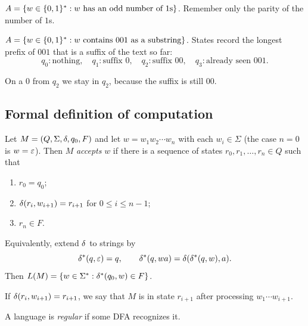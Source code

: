 \begin{example}
$A=\{w\in\{0,1\}^*:w\text{ has an odd number of }1\text{s}\}$.
Remember only the parity of the number of $1$s.
\begin{center}
\end{center}
\end{example}

\begin{example}[Substring $001$]
$A=\{w\in\{0,1\}^*:w\text{ contains }001\text{ as a substring}\}$.
States record the longest prefix of $001$ that is a suffix of the text so
far:
\[
  q_0:\text{nothing},\quad
  q_1:\text{suffix }0,\quad
  q_2:\text{suffix }00,\quad
  q_3:\text{already seen }001.
\]
\begin{center}
\end{center}
On a $0$ from $q_2$ we stay in $q_2$, because the suffix is still $00$.
\end{example}

\subsection{Formal definition of computation}
\begin{definition}
Let $M=(Q,\Sigma,\delta,q_0,F)$ and let $w=w_1w_2\cdots w_n$ with each
$w_i\in\Sigma$ (the case $n=0$ is $w=\varepsilon$). Then $M$ \emph{accepts} $w$ if
there is a sequence of states $r_0,r_1,\ldots,r_n\in Q$ such that
\begin{enumerate}
  \item $r_0=q_0$;
  \item $\delta(r_i,w_{i+1})=r_{i+1}$ for $0\leq i\leq n-1$;
  \item $r_n\in F$.
\end{enumerate}
\end{definition}
Equivalently, extend $\delta$ to strings by
\[
  \delta^*(q,\varepsilon)=q,\qquad
  \delta^*(q,wa)=\delta(\delta^*(q,w),a).
\]
Then $L(M)=\{w\in\Sigma^*:\delta^*(q_0,w)\in F\}$.

If $\delta(r_i,w_{i+1})=r_{i+1}$, we say that $M$ is in state $r_{i+1}$
after processing $w_1\cdots w_{i+1}$.

\begin{definition}
A language is \emph{regular} if some DFA recognizes it.
\end{definition}
